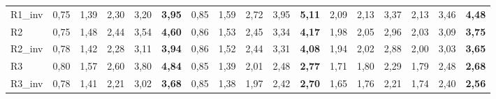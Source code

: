 \begin{table}[H]
{\begin{tabular}{@{}l|ccccc|ccccc|cccccc@{}}
R1\_inv         & 0{,}75 & 1{,}39 & 2{,}30 & 3{,}20 & \textbf{3{,}95} & 0{,}85 & 1{,}59 & 2{,}72 & 3{,}95 & \textbf{5{,}11} & 2{,}09 & 2{,}13 & 3{,}37 & 2{,}13 & 3{,}46 & \textbf{4{,}48} \\
R2              & 0{,}75 & 1{,}48 & 2{,}44 & 3{,}54 & \textbf{4{,}60} & 0{,}86 & 1{,}53 & 2{,}45 & 3{,}34 & \textbf{4{,}17} & 1{,}98 & 2{,}05 & 2{,}96 & 2{,}03 & 3{,}09 & \textbf{3{,}75} \\
R2\_inv         & 0{,}78 & 1{,}42 & 2{,}28 & 3{,}11 & \textbf{3{,}94} & 0{,}86 & 1{,}52 & 2{,}44 & 3{,}31 & \textbf{4{,}08} & 1{,}94 & 2{,}02 & 2{,}88 & 2{,}00 & 3{,}03 & \textbf{3{,}65} \\
R3              & 0{,}80 & 1{,}57 & 2{,}60 & 3{,}80 & \textbf{4{,}84} & 0{,}85 & 1{,}39 & 2{,}01 & 2{,}48 & \textbf{2{,}77} & 1{,}71 & 1{,}80 & 2{,}29 & 1{,}79 & 2{,}48 & \textbf{2{,}68} \\
R3\_inv         & 0{,}78 & 1{,}41 & 2{,}21 & 3{,}02 & \textbf{3{,}68} & 0{,}85 & 1{,}38 & 1{,}97 & 2{,}42 & \textbf{2{,}70} & 1{,}65 & 1{,}76 & 2{,}21 & 1{,}74 & 2{,}40 & \textbf{2{,}56} \\ \bottomrule
\end{tabular}%
}
\end{table}

